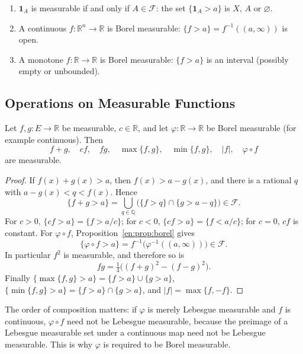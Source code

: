 \documentclass[11pt]{article}
\makeatletter
\newcommand{\envlabel}[1]{\protected@edef\@currentlabel{\themathenv}\label{#1}}
\makeatother
\begin{document}
\begin{example}
\leavevmode
\begin{enumerate}
  \item $\mathbf{1}_{A}$ is measurable if and only if $A\in\mathcal{F}$: the set $\{\mathbf{1}_{A}>a\}$ is $X$, $A$ or $\varnothing$.
  \item A continuous $f:\mathbb{R}^{n}\to\mathbb{R}$ is Borel measurable: $\{f>a\}=f^{-1}((a,\infty))$ is open.
  \item A monotone $f:\mathbb{R}\to\mathbb{R}$ is Borel measurable: $\{f>a\}$ is an interval (possibly empty or unbounded).
\end{enumerate}
\end{example}

\subsection{Operations on Measurable Functions}

\begin{proposition}\envlabel{en:prop:alg}
Let $f,g:E\to\mathbb{R}$ be measurable, $c\in\mathbb{R}$, and let $\varphi:\mathbb{R}\to\mathbb{R}$ be Borel measurable (for example continuous). Then
\[
f+g,\quad cf,\quad fg,\quad \max\{f,g\},\quad \min\{f,g\},\quad |f|,\quad \varphi\circ f
\]
are measurable.
\end{proposition}

\begin{proof}
If $f(x)+g(x)>a$, then $f(x)>a-g(x)$, and there is a rational $q$ with $a-g(x)<q<f(x)$. Hence
\[
\{f+g>a\}=\bigcup_{q\in\mathbb{Q}}\big(\{f>q\}\cap\{g>a-q\}\big)\in\mathcal{F}.
\]
For $c>0$, $\{cf>a\}=\{f>a/c\}$; for $c<0$, $\{cf>a\}=\{f<a/c\}$; for $c=0$, $cf$ is constant. For $\varphi\circ f$, Proposition~\ref{en:prop:borel} gives
\[
\{\varphi\circ f>a\}=f^{-1}\big(\varphi^{-1}((a,\infty))\big)\in\mathcal{F}.
\]
In particular $f^{2}$ is measurable, and therefore so is
\[
fg=\tfrac14\big((f+g)^{2}-(f-g)^{2}\big).
\]
Finally $\{\max\{f,g\}>a\}=\{f>a\}\cup\{g>a\}$, $\{\min\{f,g\}>a\}=\{f>a\}\cap\{g>a\}$, and $|f|=\max\{f,-f\}$.
\end{proof}

\begin{remark}
The order of composition matters: if $\varphi$ is merely Lebesgue measurable and $f$ is continuous, $\varphi\circ f$ need not be Lebesgue measurable, because the preimage of a Lebesgue measurable set under a continuous map need not be Lebesgue measurable. This is why $\varphi$ is required to be Borel measurable.
\end{remark}
\end{document}
